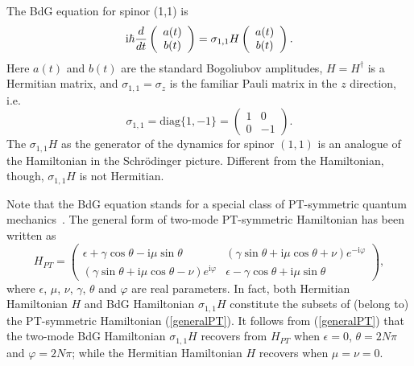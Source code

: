 \documentclass[pra,epsfig,rotate,superscriptaddress,showpacs]{revtex4}
\begin{document}
The BdG equation for spinor (1,1) is
\begin{equation} \label{evolution}
{\text i}\hbar\frac{d}{dt}\left(\begin{array}{c}a(t) \\b(t)\end{array} \right)=\sigma_{1,1} H \left(\begin{array}{c}a(t) \\b(t)\end{array} \right).
\end{equation}
Here $a(t)$ and $b(t)$ are the standard Bogoliubov amplitudes, $H=H^\dag$ is a Hermitian matrix, and $\sigma_{1,1}=\sigma_z$ is the familiar Pauli matrix in the $z$ direction, i.e.
\begin{equation}
\sigma_{1,1}= {\text {diag}} \{1,-1\} =\left(\begin{array}{cc}1&0\\ 0&-1\end{array} \right).
\end{equation}
The $\sigma_{1,1}H$ as the generator of the dynamics for spinor $(1,1)$
is an analogue of the Hamiltonian in the Schr\"odinger picture. Different from the Hamiltonian, though, $\sigma_{1,1} H$ is not Hermitian.

Note that the BdG equation stands for a special class of PT-symmetric quantum mechanics~\cite{wang,Bender2,Bender3,Bender4,Bender5}. The general form of two-mode PT-symmetric Hamiltonian has been written as~\cite{wang,Bender2,Bender3,Bender4,Bender5}
\begin{equation} \label{generalPT}
H_{PT}=\left(\begin{array}{cc} \epsilon+\gamma\cos\theta-{\text {i}}\mu\sin\theta & (\gamma\sin\theta+{\text {i}}\mu\cos\theta+\nu)e^{-{\text {i}}\varphi} \\
(\gamma\sin\theta+{\text {i}}\mu\cos\theta-\nu)e^{{\text {i}}\varphi} & \epsilon-\gamma\cos\theta+{\text {i}}\mu\sin\theta
 \end{array}\right),
\end{equation}
where $\epsilon$, $\mu$, $\nu$, $\gamma$, $\theta$ and $\varphi$ are real parameters.
In fact, both Hermitian Hamiltonian $H$ and BdG Hamiltonian $\sigma_{1,1}H$ constitute the subsets of (belong to) the PT-symmetric Hamiltonian (\ref{generalPT}).
It follows from (\ref{generalPT}) that the two-mode BdG Hamiltonian $\sigma_{1,1} H$ recovers from $H_{PT}$ when $\epsilon=0$, $\theta=2N\pi$ and $\varphi=2N\pi$; while the Hermitian Hamiltonian $H$ recovers when $\mu=\nu=0$.
\end{document}
